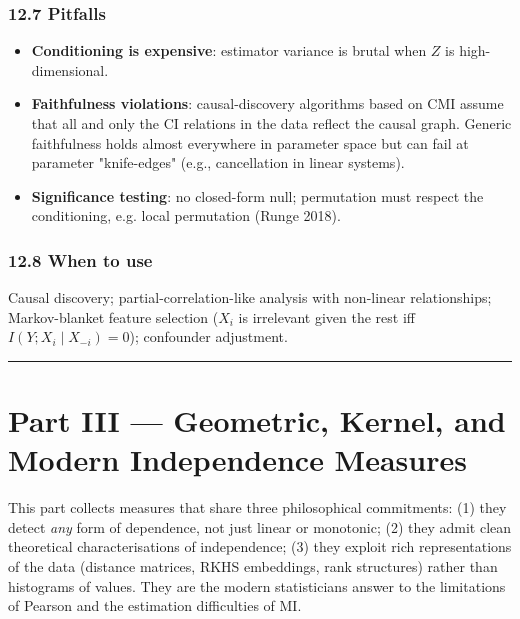 \documentclass{article}
\providecommand{\tightlist}{\setlength{\itemsep}{0pt}\setlength{\parskip}{0pt}}
\let\oldsection\section
\renewcommand{\section}{\clearpage\oldsection}
\begin{document}
\subsubsection{12.7 Pitfalls}\label{127-pitfalls}

\begin{itemize}
\tightlist
\item
  \textbf{Conditioning is expensive}: estimator variance is brutal when
  \(Z\) is high-dimensional.
\item
  \textbf{Faithfulness violations}: causal-discovery algorithms based on
  CMI assume that all and only the CI relations in the data reflect the
  causal graph. Generic faithfulness holds almost everywhere in
  parameter space but can fail at parameter "knife-edges" (e.g.,
  cancellation in linear systems).
\item
  \textbf{Significance testing}: no closed-form null; permutation must
  respect the conditioning, e.g. local permutation (Runge 2018).
\end{itemize}

\subsubsection{12.8 When to use}\label{128-when-to-use}

Causal discovery; partial-correlation-like analysis with non-linear
relationships; Markov-blanket feature selection (\(X_i\) is irrelevant
given the rest iff \(I(Y; X_i \mid X_{-i}) = 0\)); confounder
adjustment.

\begin{center}\rule{0.5\linewidth}{0.5pt}\end{center}

\section{Part III --- Geometric, Kernel, and Modern Independence
Measures}\label{part-iii--geometric-kernel-and-modern-independence-measures}

This part collects measures that share three philosophical commitments:
(1) they detect \emph{any} form of dependence, not just linear or
monotonic; (2) they admit clean theoretical characterisations of
independence; (3) they exploit rich representations of the data
(distance matrices, RKHS embeddings, rank structures) rather than
histograms of values. They are the modern statistician\textquotesingle s
answer to the limitations of Pearson and the estimation difficulties of
MI.
\end{document}
